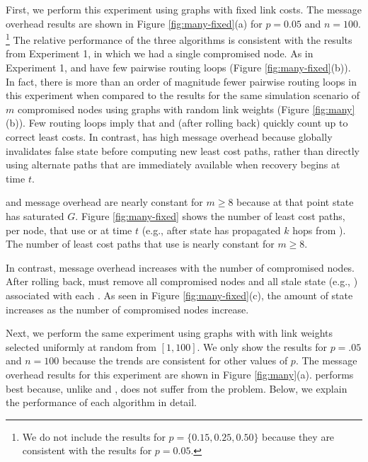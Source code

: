 First, we perform this experiment using \er graphs with fixed link costs.  The message overhead results are shown in Figure \ref{fig:many-fixed}(a) for $p=0.05$ and $n=100$. 
{\footnote {\small We do not include the results for $p=\{0.15,0.25,0.50\}$ because they are consistent with the results for $p=0.05$.}}
The relative performance of the three algorithms is consistent with the results from Experiment 1, in which we had a single compromised node.
As in Experiment 1, \second and \cpr have few pairwise routing loops (Figure \ref{fig:many-fixed}(b)).  In fact, there is more than an order of magnitude fewer pairwise routing 
loops in this experiment
when compared to the results for the same simulation scenario of $m$ compromised nodes using \er graphs with random link weights (Figure \ref{fig:many}(b)).
Few routing loops imply that \second and \cpr (after rolling back) quickly count up to correct least costs.
In contrast, \purge has high message overhead because \purge globally invalidates false state before computing new least cost paths, rather than directly using alternate paths that 
are immediately available when recovery begins at time $t$. 

\second and \purge message overhead are nearly constant for $m \geq 8$ because at that point \badvector state has saturated $G$.
Figure \ref{fig:many-fixed} shows the number of least cost paths, per node,
that use \badvector or \oldvector at time $t$ (e.g., after \badvector state has propagated $k$ hops from \bads).  The number of least cost paths that use \badvector is nearly constant for $m \geq 8$. 

In contrast, \cpr message overhead increases with the number of compromised nodes.  After rolling back, \cpr must remove all compromised nodes and all
stale state (e.g., \oldvectors) associated with each \bads. As seen in Figure \ref{fig:many-fixed}(c), 
the amount of \oldvector state increases as the number of compromised nodes increase. 

Next, we perform the same experiment using \er graphs with with link weights selected uniformly at random from $[1,100]$. We only show the results for $p=.05$ and $n=100$ because the 
trends are consistent for other values of $p$.
The message overhead results for this experiment are shown in Figure \ref{fig:many}(a). \purge performs best because, unlike \second and \cprs, \purge does not suffer 
from the \infinity problem.  Below, we explain the performance of each algorithm in detail.

